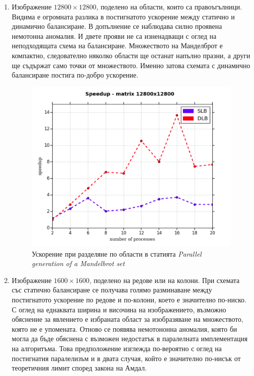 \documentclass[a4paper,11pt]{article}
\begin{document}
\begin{enumerate}
    \item Изображение $12800\times12800$, поделено на области, които са правоъгълници. Видима е огромната разлика в постигнатото ускорение между статично и динамично балансиране. В допълнение се наблюдава силно проявена немотонна аномалия. И двете прояви не са изненадващи с оглед на неподходящата схема на балансиране. Множеството на Манделброт е компактно, следователно няколко области ще останат напълно празни, а други ще съдържат само точки от множеството. Именно затова схемата с динамично балансиране постига по-добро ускорение.
    \begin{figure}[H]
        \centering
        \includegraphics[width=0.9\linewidth]{images/mirco1.png}
        \caption{Ускорение при разделяне по области в статията \emph{Parallel generation of a Mandelbrot set}}
        \label{fig:enter-label}
    \end{figure}
    \item Изображение $1600\times1600$, поделено на редове или на колони. При схемата със статично балансиране се получава голямо разминаване между постигнатото ускорение по редове и по-колони, което е значително по-ниско. С оглед на еднаквата ширина и височина на изображението, възможно обяснение за явлението е избраната област за изобразяване на множеството, която не е упомената. Отново се появява немотононна аномалия, която би могла да бъде обяснена с възможен недостатък в паралелната имплементация на алгоритъма. Това предположение изглежда по-вероятно с оглед на постигнатия паралелизъм и в двата случая, който е значително по-нисък от теоретичния лимит според закона на Амдал. 

\end{enumerate}
\end{document}
